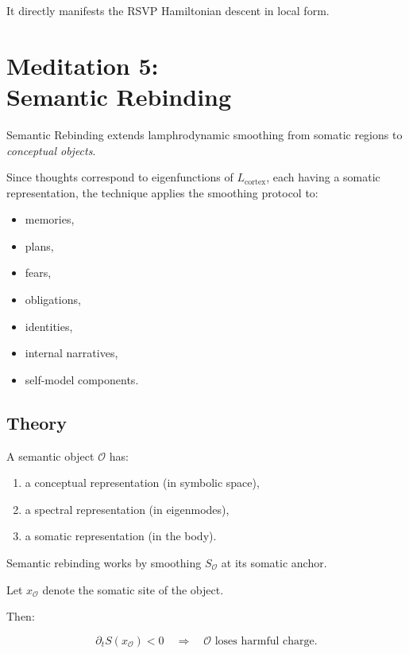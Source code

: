 \documentclass[12pt]{article}
\begin{document}
It directly manifests the RSVP Hamiltonian descent in local form.

\newpage


\chapter{Meditation 5:\\ Semantic Rebinding}

Semantic Rebinding extends lamphrodynamic smoothing from somatic regions to
\emph{conceptual objects}.

Since thoughts correspond to eigenfunctions of $L_{\text{cortex}}$, each having a
somatic representation, the technique applies the smoothing protocol to:

\begin{itemize}
    \item memories,
    \item plans,
    \item fears,
    \item obligations,
    \item identities,
    \item internal narratives,
    \item self-model components.
\end{itemize}

\section{Theory}

A semantic object $\mathcal{O}$ has:

\begin{enumerate}
    \item a conceptual representation (in symbolic space),
    \item a spectral representation (in eigenmodes),
    \item a somatic representation (in the body).
\end{enumerate}

Semantic rebinding works by smoothing $S_{\mathcal{O}}$ at its somatic anchor.

Let $x_{\mathcal{O}}$ denote the somatic site of the object.

Then:

\[
\partial_t S(x_{\mathcal{O}}) < 0
\quad \Rightarrow \quad
\mathcal{O} \text{ loses harmful charge}.
\]
\end{document}
